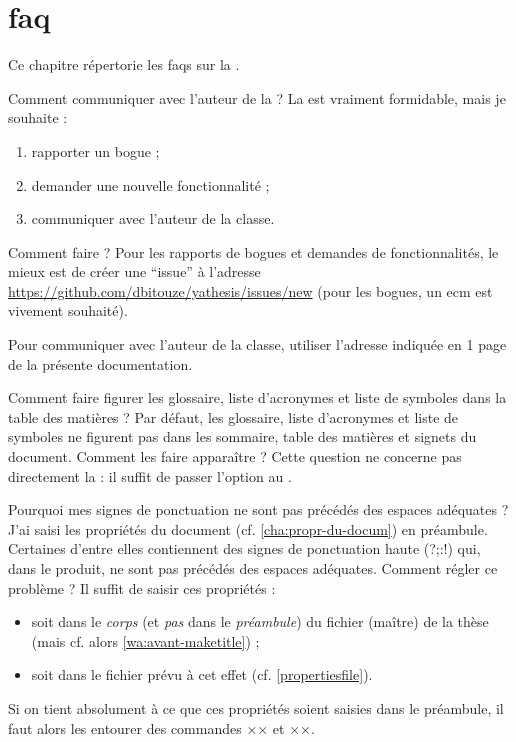 \chapter{\texorpdfstring{\acrshort{faq}}{FAQ}}\label{cha:faq}

Ce chapitre répertorie les \glspl{faq} sur la \yatcl{}.

\begin{dbfaq}{Comment communiquer avec l'auteur de la \yatcl{} ?}{}
  La \yatcl{} est vraiment formidable, mais je souhaite :
  \begin{enumerate}
  \item rapporter un bogue ;
  \item demander une nouvelle fonctionnalité ;
  \item communiquer avec l'auteur de la classe.
  \end{enumerate}
  Comment faire ?
  \tcblower
  Pour les rapports de bogues et demandes de fonctionnalités, le mieux est de
  créer une \enquote{issue} à l'adresse
  \url{https://github.com/dbitouze/yathesis/issues/new} (pour les bogues, un
  \gls{ecm} est vivement souhaité).

  Pour communiquer avec l'auteur de la classe, utiliser l'adresse indiquée en
  1\iere{} page de la présente documentation.
\end{dbfaq}

\begin{dbfaq}{Comment faire figurer les glossaire, liste d'acronymes et liste
    de symboles dans la table des matières ?}{}
  Par défaut, les glossaire, liste d'acronymes et liste de symboles ne figurent
  pas dans les sommaire, table des matières et signets du document. Comment les
  faire apparaître ?
  \tcblower
  Cette question ne concerne pas directement la \yatcl{} : il suffit de passer
  l'option  au .
\end{dbfaq}

\begin{dbfaq}{Pourquoi mes signes de ponctuation ne sont pas précédés
    des espaces adéquates ?}{}
  J'ai saisi les propriétés du document (cf. \vref{cha:propr-du-docum}) en
  préambule. Certaines d'entre elles contiennent des signes de ponctuation
  haute ({\NoAutoSpacing?;:!}) qui, dans le \pdf produit, ne sont pas précédés
  des espaces adéquates. Comment régler ce problème ?
  \tcblower
  Il suffit de saisir ces propriétés :
  \begin{itemize}
  \item soit dans le \emph{corps} (et \emph{pas} dans le \emph{préambule}) du
    fichier (maître) de la thèse (mais cf. alors \vref{wa:avant-maketitle}) ;
  \item soit dans le fichier \file{\propertiesfile} prévu à cet effet
    (cf. \vref{propertiesfile}).
  \end{itemize}
  Si on tient absolument à ce que ces propriétés soient saisies dans le
  préambule, il faut alors les entourer des commandes ×× et
  ××.
\end{dbfaq}

